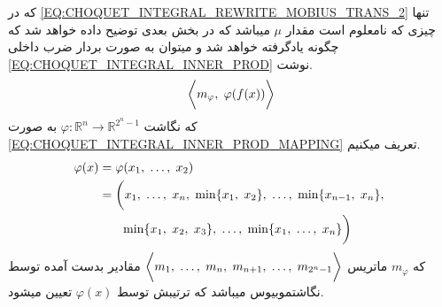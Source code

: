 \documentclass[journal]{IEEEtran}
\newcommand{\نیمفاصله}{\halfspace}
\renewcommand{\ }{\halfspace}
\renewcommand{\یا}{یادگیری\ ارجحیت }
\newcommand{\یم}{یادگیری\ ماشین }
\renewcommand{\تر}{تابع رتبه\ بند }
\newcommand{\ار}{ارجحیت }
\renewcommand{\|}[1][.3em]{\hspace{#1}|\hspace{#1}}
\renewcommand{\,}[1][.3em]{,\hspace{#1}}
\begin{document}
که در
\ref{EQ:CHOQUET_INTEGRAL_REWRITE_MOBIUS_TRANS_2}
تنها چیزی که نامعلوم است مقدار $\mu$ می\ باشد که در بخش بعدی توضیح داده خواهد شد که چگونه یادگرفته خواهد شد و می\ توان به صورت بردار ضرب داخلی
\ref{EQ:CHOQUET_INTEGRAL_INNER_PROD}
نوشت.
\begin{equation}\label{EQ:CHOQUET_INTEGRAL_INNER_PROD}
\bigg\langle m_\varphi\, \varphi(f(x)) \bigg\rangle
\end{equation}
که نگاشت
$\varphi : \mathbb{R}^n \rightarrow \mathbb{R}^{2^n - 1}$
به صورت
\ref{EQ:CHOQUET_INTEGRAL_INNER_PROD_MAPPING}
تعریف می\ کنیم.
\begin{align}\label{EQ:CHOQUET_INTEGRAL_INNER_PROD_MAPPING}
\begin{split}
\varphi(x) &= \varphi(x_1\,\ldots\,x_2)\\
&=\bigg(x_1\,\ldots\,x_n\,\min\{x_1\,x_2\}\,\ldots\,\min\{x_{n-1}\,x_n\}\,\\
&\hspace{1.8em}\min\{x_1\,x_2\,x_3\}\,\ldots\,\min\{x_1\,\ldots\,x_n\}\bigg)
\end{split}
\end{align}
که $m_\varphi$ ماتریس
${\bigg\langle m_1\,\ldots\,m_n\,m_{n+1}\,\ldots\,m_{2^n-1}\bigg\rangle}$
مقادیر بدست آمده توسط نگاشت\ موبیوس می\ باشد که ترتیبش توسط $\varphi(x)$ تعیین می\ شود.
\end{document}
